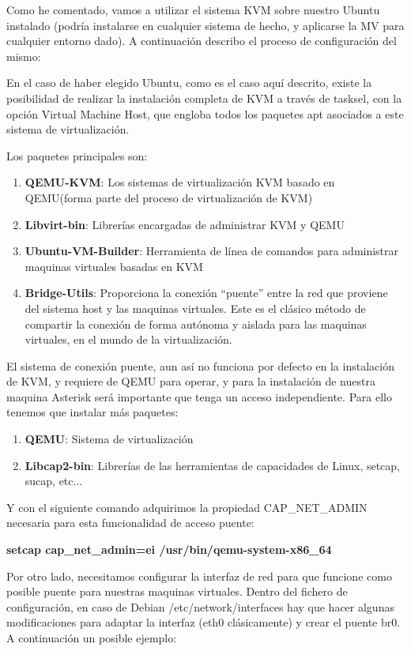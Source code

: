 Como he comentado, vamos a utilizar el sistema KVM sobre nuestro Ubuntu instalado (podría instalarse en cualquier sistema de hecho, y aplicarse la MV para cualquier entorno dado). A continuación describo el proceso de configuración del mismo:

En el caso de haber elegido Ubuntu, como es el caso aquí descrito, existe la posibilidad de realizar la instalación completa de KVM a través de tasksel, con la opción Virtual Machine Host, que engloba todos los paquetes apt asociados a este sistema de virtualización.

Los paquetes principales son:

\begin{enumerate}
\item \textbf{QEMU-KVM}: Los sistemas de virtualización KVM basado en QEMU(forma parte del proceso de virtualización de KVM)
\item \textbf{Libvirt-bin}: Librerías encargadas de administrar KVM y QEMU
\item \textbf{Ubuntu-VM-Builder}: Herramienta de línea de comandos para administrar maquinas virtuales basadas en KVM
\item \textbf{Bridge-Utils}: Proporciona la conexión “puente” entre la red que proviene del sistema host y las maquinas virtuales. Este es el clásico método de compartir la conexión de forma autónoma y aislada para las maquinas virtuales, en el mundo de la virtualización.
\end{enumerate}

El sistema de conexión puente, aun así no funciona por defecto en la instalación de KVM, y requiere de QEMU para operar, y para la instalación de nuestra maquina Asterisk será importante que tenga un acceso independiente. Para ello tenemos que instalar más paquetes:

\begin{enumerate}
\item \textbf{QEMU}: Sistema de virtualización
\item \textbf{Libcap2-bin}: Librerías de las herramientas de capacidades de Linux, setcap, sucap, etc...
\end{enumerate}

Y con el siguiente comando adquirimos la propiedad CAP\_NET\_ADMIN necesaria para esta funcionalidad de acceso puente:

\textbf{setcap cap\_net\_admin=ei /usr/bin/qemu-system-x86\_64}

Por otro lado, necesitamos configurar la interfaz de red para que funcione como posible puente para nuestras maquinas virtuales. Dentro del fichero de configuración, en caso de Debian /etc/network/interfaces hay que hacer algunas modificaciones para adaptar la interfaz (eth0 clásicamente) y crear el puente br0. A continuación un posible ejemplo:

